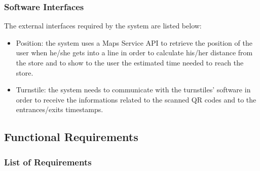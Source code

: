 \documentclass{article}
\begin{document}
\subsubsection{Software Interfaces}
The external interfaces required by the system are listed below:
\begin{itemize}
\item Position: the system uses a Maps Service API to retrieve the position of the user when he/she gets into a line in order to calculate his/her distance from the store and to show to the user the estimated time needed to reach the store.
\item Turnstile: the system needs to communicate with the turnstiles' software in order to receive the informations related to the scanned QR codes and to the entrances/exits timestamps.
\end{itemize}
\subsection{Functional Requirements}
\subsubsection{List of Requirements}
\end{document}
